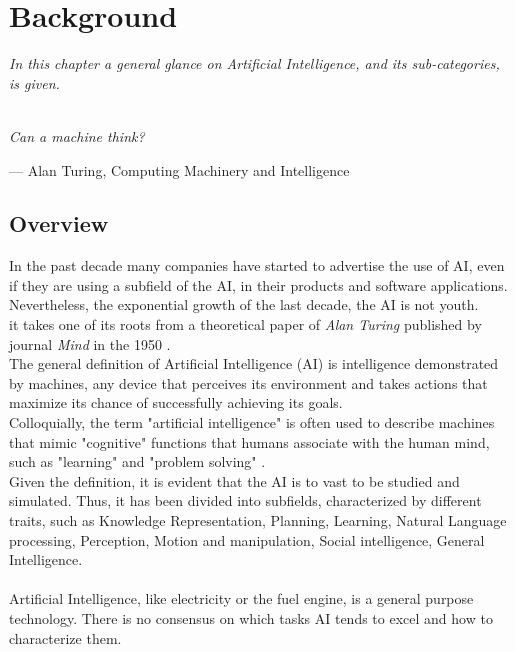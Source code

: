 \chapter{Background}
\textit{In this chapter a general glance on Artificial Intelligence, and its sub-categories, is given.}\\\\

\epigraph{ \textit{Can a machine think?}}{--- \textup{Alan Turing}, Computing Machinery and Intelligence}

\section{Overview}
In the past decade many companies have started to advertise the use of AI, even if they are using a subfield of the AI, in their products and software applications. Nevertheless, the exponential growth of the last decade,
the AI is not youth.\\ it takes one of its roots from a theoretical paper of \textit{Alan Turing} published by journal \textit{Mind} in the 1950 \cite{paper:36}.\\

The general definition of Artificial Intelligence (AI) is intelligence demonstrated by machines, any device that perceives its environment and takes actions that maximize its chance of successfully achieving its goals.\\ Colloquially, the term "artificial intelligence" is often used to describe machines that mimic "cognitive" functions that humans associate with the human mind, such as "learning" and "problem solving" \cite{book:1}.\\
Given the definition, it is evident that the AI is to vast to be studied and simulated. Thus, it has been divided into subfields, characterized by different traits, such as Knowledge Representation, Planning, Learning, Natural Language processing, Perception, Motion and manipulation, Social intelligence, General Intelligence.\\\\

Artificial Intelligence, like electricity or the fuel engine, is a general purpose technology. There is no consensus on which tasks AI tends to excel and how to characterize them.

